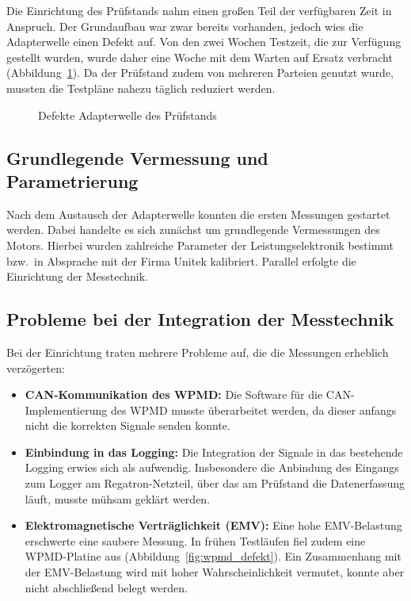 Die Einrichtung des Prüfstands nahm einen großen Teil der verfügbaren Zeit in Anspruch. Der Grundaufbau war zwar bereits vorhanden, jedoch wies die Adapterwelle einen Defekt auf. Von den zwei Wochen Testzeit, die zur Verfügung gestellt wurden, wurde daher eine Woche mit dem Warten auf Ersatz verbracht (Abbildung~\ref{fig:adapterwelle}). Da der Prüfstand zudem von mehreren Parteien genutzt wurde, mussten die Testpläne nahezu täglich reduziert werden.

\begin{figure}[htbp]
    \centering
    \caption{Defekte Adapterwelle des Prüfstands}
    \label{fig:adapterwelle}
\end{figure}

\subsection{Grundlegende Vermessung und Parametrierung}
\label{subsec:grundvermessung}

Nach dem Austausch der Adapterwelle konnten die ersten Messungen gestartet werden. Dabei handelte es sich zunächst um grundlegende Vermessungen des Motors. Hierbei wurden zahlreiche Parameter der Leistungselektronik bestimmt bzw.\ in Absprache mit der Firma Unitek kalibriert. Parallel erfolgte die Einrichtung der Messtechnik.

\subsection{Probleme bei der Integration der Messtechnik}
\label{subsec:integrationsprobleme}

Bei der Einrichtung traten mehrere Probleme auf, die die Messungen erheblich verzögerten:

\begin{itemize}
    \item \textbf{CAN-Kommunikation des WPMD:} Die Software für die CAN-Implementierung des WPMD musste überarbeitet werden, da dieser anfangs nicht die korrekten Signale senden konnte.
    \item \textbf{Einbindung in das Logging:} Die Integration der Signale in das bestehende Logging erwies sich als aufwendig. Insbesondere die Anbindung des Eingangs zum Logger am Regatron-Netzteil, über das am Prüfstand die Datenerfassung läuft, musste mühsam geklärt werden.
    \item \textbf{Elektromagnetische Verträglichkeit (EMV):} Eine hohe EMV-Belastung erschwerte eine saubere Messung. In frühen Testläufen fiel zudem eine WPMD-Platine aus (Abbildung~\ref{fig:wpmd_defekt}). Ein Zusammenhang mit der EMV-Belastung wird mit hoher Wahrscheinlichkeit vermutet, konnte aber nicht abschließend belegt werden.
\end{itemize}

